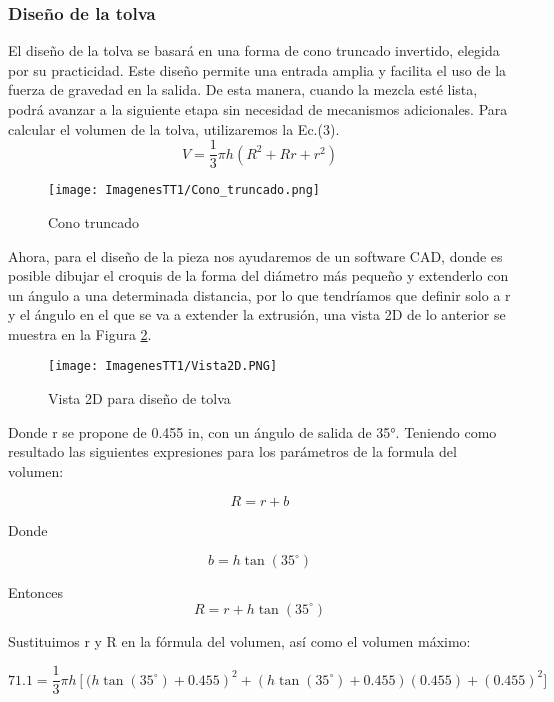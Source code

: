 \documentclass[14pt,oneside]{extarticle} %
\begin{document}
\subsubsection{Diseño de la tolva}
El diseño de la tolva se basará en una forma de cono truncado invertido, elegida por su practicidad. Este diseño permite una entrada amplia y facilita el uso de la fuerza de gravedad en la salida. De esta manera, cuando la mezcla esté lista, podrá avanzar a la siguiente etapa sin necesidad de mecanismos adicionales. Para calcular el volumen de la tolva, utilizaremos la Ec.(3).
\begin{equation}
V = \frac{1}{3}\pi h(R^2 + Rr + r^2)
\end{equation}

\begin{figure}[H]
    \centering
    \texttt{[image: ImagenesTT1/Cono\_truncado.png]}
    \caption{Cono truncado}
    \label{fig:Cono_truncado}
\end{figure}

Ahora, para el diseño de la pieza nos ayudaremos de un software CAD, donde es posible dibujar el croquis de la forma del diámetro más pequeño y extenderlo con un ángulo a una determinada distancia, por lo que tendríamos que definir solo a r y el ángulo en el que se va a extender la extrusión, una vista 2D de lo anterior se muestra en la Figura \ref{fig:Vista_2D}.
\begin{figure}[H]
    \centering
    \texttt{[image: ImagenesTT1/Vista2D.PNG]}
    \caption{Vista 2D para diseño de tolva}
    \label{fig:Vista_2D}
\end{figure}
Donde r se propone de 0.455 in, con un ángulo de salida de 35°. Teniendo como resultado las siguientes expresiones para los parámetros de la formula del volumen:

\begin{equation}
R = r + b
\end{equation}

Donde 

\begin{equation}
b = h\tan(35^\circ)
\end{equation}

Entonces
\begin{equation}
R = r + h\tan(35^\circ)
\end{equation}

Sustituimos r y R en la fórmula del volumen, así como el volumen máximo:

\begin{equation*}
    71.1 = \frac{1}{3}\pi h\left[(h\tan(35^\circ) + 0.455\right)^2 + \left(h\tan(35^\circ) + 0.455\right)(0.455) + (0.455)^2]
\end{equation*}
\end{document}
